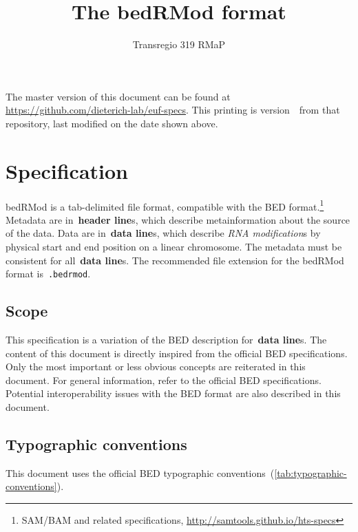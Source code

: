 \documentclass[11pt]{article}
\title{The \acf{bedRMod} format}
\author{Transregio 319 RMaP}
\date{\headdate}
\providecommand*{\Ac}[1]{\ac{#1}} %
\begin{document}
\maketitle

\begin{small}
\noindent
The master version of this document can be found at \url{https://github.com/dieterich-lab/euf-specs}.
This printing is version~\commitdesc\ from that repository, last modified on the date shown above.
\end{small}


\section{Specification}

\Ac{bedRMod} is a tab-delimited file format, compatible with the \acf{BED} format.\footnote{SAM/BAM and related specifications, \url{http://samtools.github.io/hts-specs}} Metadata are in~\textbf{header line}s, which describe metainformation about the source of the data. Data are in~\textbf{data line}s, which describe \emph{RNA modification}s by physical start and end position on a linear chromosome. The metadata must be consistent for all~\textbf{data line}s. The recommended file extension for the \ac{bedRMod} format is~\texttt{.bedrmod}.

\subsection{Scope}

This specification is a variation of the \ac{BED} description for~\textbf{data line}s. The content of this document is directly inspired from the 
official \ac{BED} specifications. Only the most important or less obvious concepts are reiterated in this document. For general information, refer to the official \ac{BED} specifications. Potential interoperability issues with the \ac{BED} format are also described in this document.

\subsection{Typographic conventions}

This document uses the official \ac{BED} typographic conventions~(\autoref{tab:typographic-conventions}).
\end{document}
